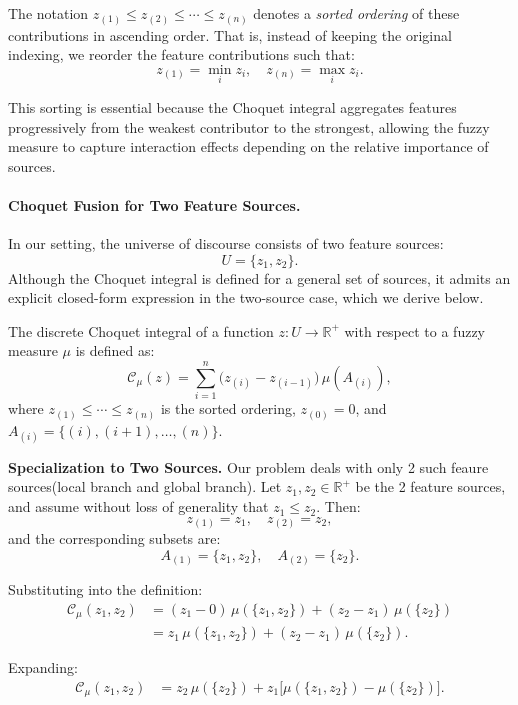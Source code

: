 \documentclass[preprint,12pt]{elsarticle}
\begin{document}
The notation $z_{(1)} \leq z_{(2)} \leq \cdots \leq z_{(n)}$ denotes a \emph{sorted ordering} 
of these contributions in ascending order. That is, instead of keeping the original indexing, 
we reorder the feature contributions such that:
\[
z_{(1)} = \min_i z_i, \quad z_{(n)} = \max_i z_i.
\]

This sorting is essential because the Choquet integral aggregates features progressively 
from the weakest contributor to the strongest, allowing the fuzzy measure to capture 
interaction effects depending on the relative importance of sources.

\paragraph{Choquet Fusion for Two Feature Sources.}

In our setting, the universe of discourse consists of two feature sources:
\[
U = \{z_1, z_2\}.
\]
Although the Choquet integral is defined for a general set of sources, it admits an explicit closed-form expression in the two-source case, which we derive below.

The discrete Choquet integral of a function $z: U \to \mathbb{R}^+$ with respect to a fuzzy measure $\mu$ is defined as:
\[
\mathcal{C}_\mu(z)
=
\sum_{i=1}^{n} \bigl(z_{(i)} - z_{(i-1)}\bigr)\,\mu(A_{(i)}),
\]
where $z_{(1)} \leq \cdots \leq z_{(n)}$ is the sorted ordering, $z_{(0)} = 0$, and $A_{(i)} = \{(i), (i+1), \ldots, (n)\}$.

\medskip

\noindent\textbf{Specialization to Two Sources.}
Our problem deals with only 2 such feaure sources(local branch and global branch). 
Let $z_1, z_2 \in \mathbb{R}^+$ be the 2 feature sources, and assume without loss of generality that $z_1 \leq z_2$. Then:
\[
z_{(1)} = z_1, \quad z_{(2)} = z_2,
\]
and the corresponding subsets are:
\[
A_{(1)} = \{z_1, z_2\}, \quad A_{(2)} = \{z_2\}.
\]

Substituting into the definition:
\begin{align*}
\mathcal{C}_\mu(z_1, z_2)
&= (z_1 - 0)\,\mu(\{z_1, z_2\})
+ (z_2 - z_1)\,\mu(\{z_2\}) \\
&= z_1\,\mu(\{z_1, z_2\})
+ (z_2 - z_1)\,\mu(\{z_2\}).
\end{align*}

Expanding:
\begin{align*}
\mathcal{C}_\mu(z_1, z_2)
&= z_2\,\mu(\{z_2\})
+ z_1\bigl[\mu(\{z_1, z_2\}) - \mu(\{z_2\})\bigr].
\end{align*}
\end{document}
